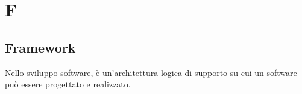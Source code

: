 \section*{F}

\subsection{Framework}
Nello sviluppo software, è un'architettura logica di supporto su cui un software può essere progettato e realizzato.
